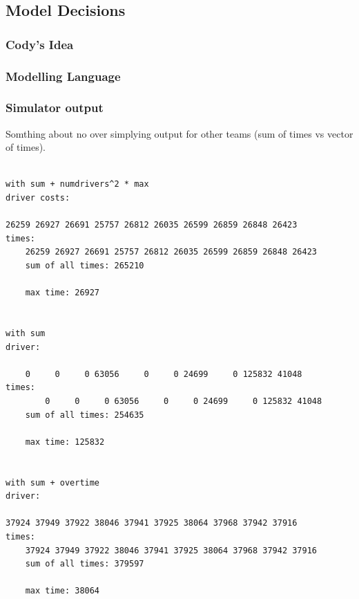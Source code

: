 \documentclass{article}
\begin{document}
\subsection{Model Decisions}


\subsubsection{Cody's Idea}
\subsubsection{Modelling Language}
\subsubsection{Simulator output}

Somthing about no over simplying output for other teams (sum of times vs vector of times).
\begin{verbatim}

with sum + numdrivers^2 * max
driver costs: 
	
26259 26927 26691 25757 26812 26035 26599 26859 26848 26423 
times: 
	26259 26927 26691 25757 26812 26035 26599 26859 26848 26423 
	sum of all times: 265210

	max time: 26927
	
	
with sum
driver: 
	
    0     0     0 63056     0     0 24699     0 125832 41048 
times: 
	    0     0     0 63056     0     0 24699     0 125832 41048 
	sum of all times: 254635

	max time: 125832
	
	
with sum + overtime
driver: 
	
37924 37949 37922 38046 37941 37925 38064 37968 37942 37916 
times: 
	37924 37949 37922 38046 37941 37925 38064 37968 37942 37916 
	sum of all times: 379597

	max time: 38064

\end{verbatim}
\end{document}
